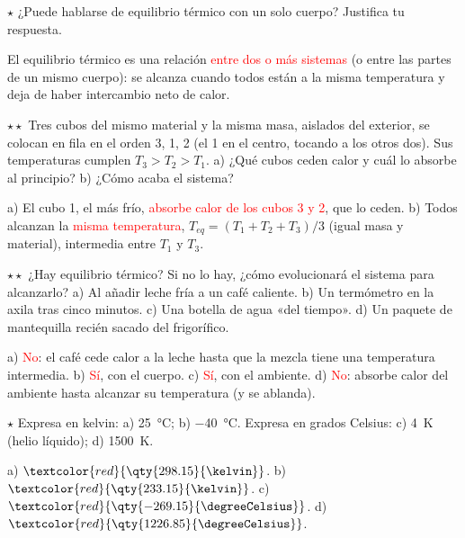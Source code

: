 \begin{exercise}
    \(\star\) ¿Puede hablarse de equilibrio térmico con un solo cuerpo? Justifica tu respuesta.
    \begin{solu}
        El equilibrio térmico es una relación \textcolor{red}{entre dos o más sistemas} (o entre las partes de un mismo cuerpo):
        se alcanza cuando todos están a la misma temperatura y deja de haber intercambio neto de calor.
    \end{solu}
\end{exercise}

\begin{exercise}
    \(\star\star\) Tres cubos del mismo material y la misma masa, aislados del exterior, se colocan en fila en el orden 3, 1, 2 (el
    1 en el centro, tocando a los otros dos). Sus temperaturas cumplen \(T_3 > T_2 > T_1\). a) ¿Qué cubos ceden calor y cuál lo
    absorbe al principio? b) ¿Cómo acaba el sistema?
    \begin{solu}
        a) El cubo 1, el más frío, \textcolor{red}{absorbe calor de los cubos 3 y 2}, que lo ceden. b) Todos alcanzan la
        \textcolor{red}{misma temperatura}, \(T_{eq} = (T_1 + T_2 + T_3)/3\) (igual masa y material), intermedia entre \(T_1\) y \(T_3\).
    \end{solu}
\end{exercise}

\begin{exercise}
    \(\star\star\) ¿Hay equilibrio térmico? Si no lo hay, ¿cómo evolucionará el sistema para alcanzarlo? a) Al añadir leche fría a
    un café caliente. b) Un termómetro en la axila tras cinco minutos. c) Una botella de agua «del tiempo». d) Un paquete de
    mantequilla recién sacado del frigorífico.
    \begin{solu}
        a) \textcolor{red}{No}: el café cede calor a la leche hasta que la mezcla tiene una temperatura intermedia. b)
        \textcolor{red}{Sí}, con el cuerpo. c) \textcolor{red}{Sí}, con el ambiente. d) \textcolor{red}{No}: absorbe calor del
        ambiente hasta alcanzar su temperatura (y se ablanda).
    \end{solu}
\end{exercise}

\begin{exercise}
    \(\star\) Expresa en kelvin: a) \qty{25}{\degreeCelsius}; b) \qty{-40}{\degreeCelsius}. Expresa en grados Celsius: c)
    \qty{4}{\kelvin} (helio líquido); d) \qty{1500}{\kelvin}.
    \begin{solu}
        a) \(\textcolor{red}{\qty{298.15}{\kelvin}}\). b) \(\textcolor{red}{\qty{233.15}{\kelvin}}\). c)
        \(\textcolor{red}{\qty{-269.15}{\degreeCelsius}}\). d) \(\textcolor{red}{\qty{1226.85}{\degreeCelsius}}\).
    \end{solu}
\end{exercise}

